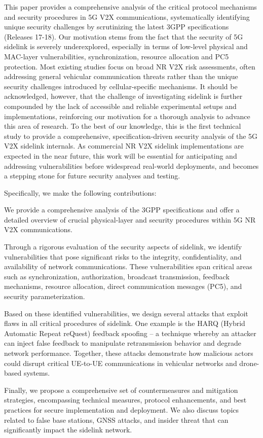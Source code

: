 This paper provides a comprehensive analysis of the critical protocol mechanisms and security procedures in 5G V2X communications, systematically identifying unique security challenges by scrutinizing the latest 3GPP specifications (Releases 17-18). Our motivation stems from the fact that the security of 5G sidelink is severely underexplored, especially in terms of low-level physical and MAC-layer vulnerabilities, synchronization, resource allocation and PC5 protection. Most existing studies focus on broad NR V2X risk assessments, often addressing general vehicular communication threats rather than the unique security challenges introduced by cellular-specific mechanisms. It should be acknowledged, however, that the challenge of investigating sidelink is further compounded by the lack of accessible and reliable experimental setups and implementations, reinforcing our motivation for a thorough analysis to advance this area of research. To the best of our knowledge, this is the first technical study to provide a comprehensive, specification-driven security analysis of the 5G V2X sidelink internals. As commercial NR V2X sidelink implementations are expected in the near future, this work will be essential for anticipating and addressing vulnerabilities before widespread real-world deployments, and becomes a stepping stone for future security analyses and testing. 

Specifically, we make the following contributions:
\begin{compactenum}
    \item We provide a comprehensive analysis of the 3GPP specifications and offer a detailed overview of crucial physical-layer and security procedures within 5G NR V2X communications.
    \item Through a rigorous evaluation of the security aspects of sidelink, we identify vulnerabilities that pose significant risks to the integrity, confidentiality, and availability of network communications. These vulnerabilities span critical areas such as synchronization, authorization, broadcast transmission, feedback mechanisms, resource allocation, direct communication messages (PC5), and security parameterization.
    \item Based on these identified vulnerabilities, we design several attacks that exploit flaws in all critical procedures of sidelink. One example is the HARQ (Hybrid Automatic Repeat reQuest) feedback spoofing -- a technique whereby an attacker can inject false feedback to manipulate retransmission behavior and degrade network performance. Together, these attacks demonstrate how malicious actors could disrupt critical UE-to-UE communications in vehicular networks and drone-based systems. 
    \item Finally, we propose a comprehensive set of countermeasures and mitigation strategies, encompassing technical measures, protocol enhancements, and best practices for secure implementation and deployment. We also discuss topics related to false base stations, GNSS attacks, and insider threat that can significantly impact the sidelink network.
\end{compactenum}

